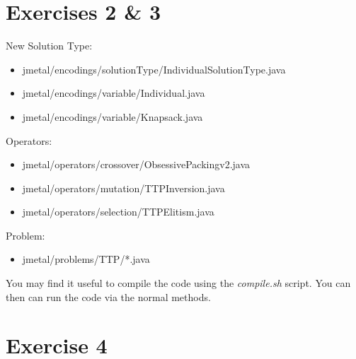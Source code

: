 \documentclass[a4paper,12pt]{article}
\begin{document}
\newpage
\section*{Exercises 2 \& 3}
New Solution Type:
\begin{itemize}
\item jmetal/encodings/solutionType/IndividualSolutionType.java
\item jmetal/encodings/variable/Individual.java
\item jmetal/encodings/variable/Knapsack.java
\end{itemize}
Operators:
\begin{itemize}
\item jmetal/operators/crossover/ObsessivePackingv2.java
\item jmetal/operators/mutation/TTPInversion.java
\item jmetal/operators/selection/TTPElitism.java
\end{itemize}
Problem:
\begin{itemize}
\item jmetal/problems/TTP/*.java
\end{itemize}
You may find it useful to compile the code using the \textit{compile.sh} script. You can then can run the code via the normal methods.\\
\paragraph{ }
\newpage
\section*{Exercise 4}
\end{document}
